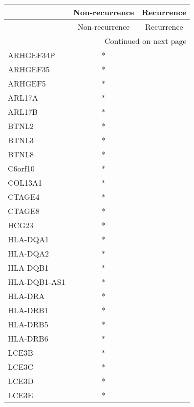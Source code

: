 \begin{longtable}{lcc}
\toprule
{} & Non-recurrence & Recurrence \\
\midrule
\endfirsthead

\toprule
{} & Non-recurrence & Recurrence \\
\midrule
\endhead
\midrule
\multicolumn{3}{r}{{Continued on next page}} \\
\midrule
\endfoot

\bottomrule
\endlastfoot
ARHGEF34P    &              * &            \\
ARHGEF35     &              * &            \\
ARHGEF5      &              * &            \\
ARL17A       &              * &            \\
ARL17B       &              * &            \\
BTNL2        &              * &            \\
BTNL3        &              * &            \\
BTNL8        &              * &            \\
C6orf10      &              * &            \\
COL13A1      &              * &            \\
CTAGE4       &              * &            \\
CTAGE8       &              * &            \\
HCG23        &              * &            \\
HLA-DQA1     &              * &            \\
HLA-DQA2     &              * &            \\
HLA-DQB1     &              * &            \\
HLA-DQB1-AS1 &              * &            \\
HLA-DRA      &              * &            \\
HLA-DRB1     &              * &            \\
HLA-DRB5     &              * &            \\
HLA-DRB6     &              * &            \\
LCE3B        &              * &            \\
LCE3C        &              * &            \\
LCE3D        &              * &            \\
LCE3E        &              * &            \\

\end{longtable}

